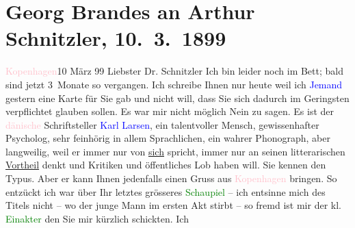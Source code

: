 

               \section[Georg Brandes an Arthur Schnitzler, 10. 3. 1899]{ Georg Brandes an Arthur Schnitzler, 10. 3. 1899}\nopagebreak{}\rehead{ }\normalsize\beginnumbering{} \toendnotes[C]{\smallbreak\pagebreak[2]} 
\toendnotes[C]{\smallbreak}\pstart
           \raggedleft{}{\pb}\textcolor{pink}{Kopenhagen}{}\ledrightnote{\textcolor{pink}{Kopenhagen}}{ }10 März 99\pend
           \pstart{}Liebster Dr. Schnitzler\pend\pstart
           Ich bin leider noch im Bett; bald sind jetzt 3 Monate so vergangen. Ich schreibe
               Ihnen nur heute weil ich \textcolor{blue}{Jemand}{}
               gestern eine Karte für Sie gab und nicht will, dass Sie sich dadurch im Geringsten
               verpflichtet glauben sollen. Es war mir nicht möglich Nein zu sagen. Es ist der \textcolor{pink}{dänische}{}\ledrightnote{\textcolor{pink}{Dänemark}} Schriftsteller \textcolor{blue}{Karl Larsen}{}\ledrightnote{\textcolor{blue}{Karl Larsen}}, ein talentvoller Mensch, gewissenhafter Psycholog,
               sehr feinhörig in allem Sprachlichen, ein wahrer Phonograph, aber langweilig, weil er
               immer nur von \uline{sich} spricht, immer nur an seinen
               litterarischen \uline{Vortheil} denkt und Kritiken und
               öffentliches Lob haben will. Sie kennen den Typus.\pend
           \pstart
           Aber er kann Ihnen jedenfalls einen {\pb}Gruss aus \textcolor{pink}{Kopenhagen}{}\ledrightnote{\textcolor{pink}{Kopenhagen}} bringen.\pend
           \pstart
           So entzückt ich war über Ihr letztes grösseres \textcolor{green}{Schaupiel}{} – ich entsinne mich des Titels nicht – wo der
               junge Mann im ersten Akt stirbt – so fremd ist mir der kl. \textcolor{green}{Einakter}{} den Sie mir kürzlich schickten. Ich
